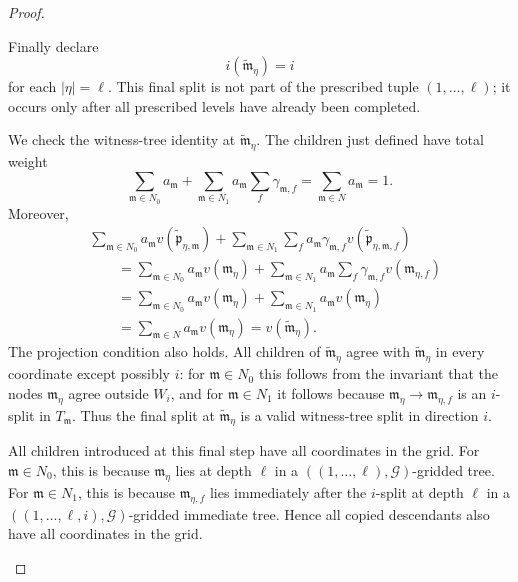 \documentclass[10pt]{amsart}
\theoremstyle{plain}
\theoremstyle{definition}
\providecommand{\cG}[0]{\ensuremath{\mathcal G}\xspace}
\newcommand{\fp}{\mathfrak{p}}
\begin{document}
\begin{proof}
\begin{enumerate}[1.]
\begin{enumerate}
Finally declare
\[
        i(\widetilde{\mathfrak{m}}_\eta)=i
\]
for each \(|\eta|=\ell\).  This final split is not part of the prescribed tuple
\((1,\ldots,\ell)\); it occurs only after all prescribed levels have already been completed.

We check the witness-tree identity at \(\widetilde{\mathfrak{m}}_\eta\).  The children just defined have total
weight
\[
        \sum_{\mathfrak{m}\in N_0}a_{\mathfrak{m}}
        +
        \sum_{\mathfrak{m}\in N_1}a_{\mathfrak{m}}
        \sum_f \gamma_{\mathfrak{m},f}
        =
        \sum_{\mathfrak{m}\in N}a_{\mathfrak{m}}=1.
\]
Moreover,
\[
\begin{aligned}
        &\sum_{\mathfrak{m}\in N_0}a_{\mathfrak{m}} v(\widetilde{\fp}_{\eta,\mathfrak{m}})
        +
        \sum_{\mathfrak{m}\in N_1}\sum_f a_{\mathfrak{m}}\gamma_{\mathfrak{m},f}v(\widetilde{\fp}_{\eta,\mathfrak{m},f})        \\
        &\qquad =
        \sum_{\mathfrak{m}\in N_0}a_{\mathfrak{m}} v(\mathfrak{m}_\eta)
        +
        \sum_{\mathfrak{m}\in N_1}a_{\mathfrak{m}}
        \sum_f \gamma_{\mathfrak{m},f}v(\mathfrak{m}_{\eta,f})                             \\
        &\qquad =
        \sum_{\mathfrak{m}\in N_0}a_{\mathfrak{m}} v(\mathfrak{m}_\eta)
        +
        \sum_{\mathfrak{m}\in N_1}a_{\mathfrak{m}} v(\mathfrak{m}_\eta)                                  \\
        &\qquad =
        \sum_{\mathfrak{m}\in N}a_{\mathfrak{m}} v(\mathfrak{m}_\eta)
        =
        v(\widetilde{\mathfrak{m}}_\eta).
\end{aligned}
\]
The projection condition also holds.  All children of \(\widetilde{\mathfrak{m}}_\eta\) agree with \(\widetilde{\mathfrak{m}}_\eta\) in
every coordinate except possibly \(i\): for \(\mathfrak{m}\in N_0\) this follows from the invariant that
the nodes \(\mathfrak{m}_\eta\) agree outside \(W_i\), and for \(\mathfrak{m}\in N_1\) it follows because
\(\mathfrak{m}_\eta\to \mathfrak{m}_{\eta,f}\) is an \(i\)-split in \(T_{\mathfrak{m}}\).  Thus the final split at \(\widetilde{\mathfrak{m}}_\eta\)
is a valid witness-tree split in direction \(i\).

All children introduced at this final step have all coordinates in the grid. For
\(\mathfrak{m}\in N_0\), this is because \(\mathfrak{m}_\eta\) lies at depth \(\ell\) in a
\(((1,\ldots,\ell),\cG)\)-gridded tree.  For \(\mathfrak{m}\in N_1\), this is because
\(\mathfrak{m}_{\eta,f}\) lies immediately after the \(i\)-split at depth \(\ell\) in a
\(((1,\ldots,\ell,i),\cG)\)-gridded immediate tree.  Hence all copied descendants
also have all coordinates in the grid.


\end{enumerate}
\end{enumerate}
\end{proof}
\end{document}
